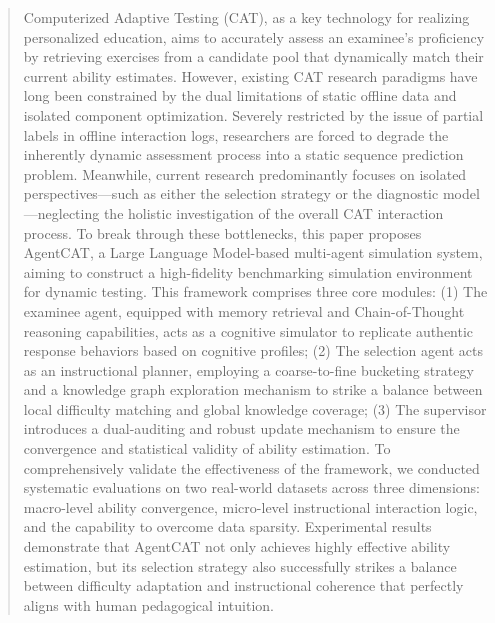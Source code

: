 
\begin{abstract}
Computerized Adaptive Testing (CAT), as a key technology for realizing personalized education, aims to accurately assess an examinee's proficiency by retrieving exercises from a candidate pool that dynamically match their current ability estimates. However, existing CAT research paradigms have long been constrained by the dual limitations of static offline data and isolated component optimization. Severely restricted by the issue of partial labels in offline interaction logs, researchers are forced to degrade the inherently dynamic assessment process into a static sequence prediction problem. Meanwhile, current research predominantly focuses on isolated perspectives—such as either the selection strategy or the diagnostic model—neglecting the holistic investigation of the overall CAT interaction process. To break through these bottlenecks, this paper proposes AgentCAT, a Large Language Model-based multi-agent simulation system, aiming to construct a high-fidelity benchmarking simulation environment for dynamic testing. This framework comprises three core modules: (1) The examinee agent, equipped with memory retrieval and Chain-of-Thought reasoning capabilities, acts as a cognitive simulator to replicate authentic response behaviors based on cognitive profiles; (2) The selection agent acts as an instructional planner, employing a coarse-to-fine bucketing strategy and a knowledge graph exploration mechanism to strike a balance between local difficulty matching and global knowledge coverage; (3) The supervisor introduces a dual-auditing and robust update mechanism to ensure the convergence and statistical validity of ability estimation. To comprehensively validate the effectiveness of the framework, we conducted systematic evaluations on two real-world datasets across three dimensions: macro-level ability convergence, micro-level instructional interaction logic, and the capability to overcome data sparsity. Experimental results demonstrate that AgentCAT not only achieves highly effective ability estimation, but its selection strategy also successfully strikes a balance between difficulty adaptation and instructional coherence that perfectly aligns with human pedagogical intuition.
\end{abstract}